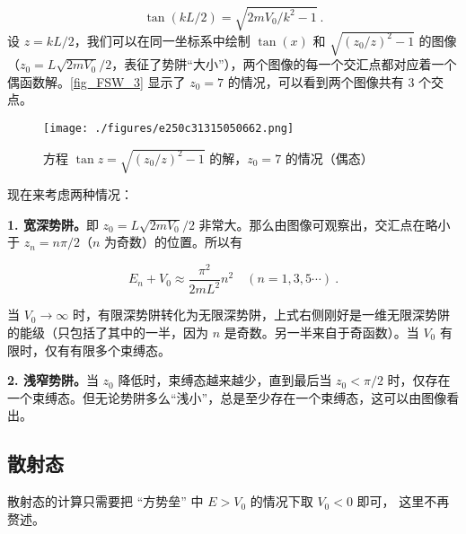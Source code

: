 \begin{equation}
\tan(k L/2)=\sqrt{2mV_0/k^2-1}~.
\end{equation}
设 $z=k L/2$，我们可以在同一坐标系中绘制 $\tan(x)$ 和 $\sqrt{(z_0/z)^2-1}$ 的图像（$z_0=L\sqrt{2mV_0}/2$，表征了势阱“大小”），两个图像的每一个交汇点都对应着一个偶函数解。\autoref{fig_FSW_3} 显示了 $z_0=7$ 的情况，可以看到两个图像共有 $3$ 个交点。

\begin{figure}[ht]
\centering
\texttt{[image: ./figures/e250c31315050662.png]}
\caption{方程 $\tan z=\sqrt{(z_0/z)^2-1}$ 的解，$z_0=7$ 的情况（偶态）} \label{fig_FSW_3}
\end{figure}

现在来考虑两种情况：

\textbf{1. 宽深势阱。}即 $z_0=L\sqrt{2mV_0}/2$ 非常大。那么由图像可观察出，交汇点在略小于 $z_n=n\pi/2$（$n$ 为奇数）的位置。所以有

\begin{equation}
E_n+V_0\approx \frac{\pi^2}{2mL^2}n^2\quad (n=1,3,5\cdots)~.
\end{equation}

当 $V_0\rightarrow \infty$ 时，有限深势阱转化为无限深势阱，上式右侧刚好是一维无限深势阱的能级（只包括了其中的一半，因为 $n$ 是奇数。另一半来自于奇函数）。当 $V_0$ 有限时，仅有有限多个束缚态。

\textbf{2. 浅窄势阱。}当 $z_0$ 降低时，束缚态越来越少，直到最后当 $z_0<\pi/2$ 时，仅存在一个束缚态。但无论势阱多么“浅小”，总是至少存在一个束缚态，这可以由图像看出。

\subsection{散射态}

散射态的计算只需要把 “方势垒” 中 $E > V_0$ 的情况下取 $V_0 < 0$ 即可， 这里不再赘述。
